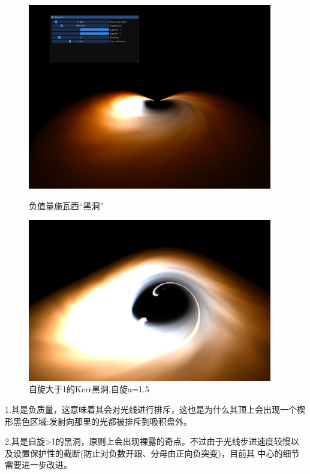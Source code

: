 \documentclass[a4paper, 12pt]{article}
\begin{document}
    \begin{figure}[H]
        \centering
        \begin{minipage}[t]{0.48\textwidth}
            \centering
            \includegraphics[width=0.95\textwidth]{photo/ip0.png}
            \caption{负值量施瓦西“黑洞”}
        \end{minipage}
        \hfill
        \begin{minipage}[t]{0.48\textwidth}
            \centering
            \includegraphics[width=0.95\textwidth]{photo/ip1.png}
            \caption{自旋大于1的Kerr黑洞,自旋a=1.5}
        \end{minipage}
    \end{figure}
    1.其是负质量，这意味着其会对光线进行排斥，这也是为什么其顶上会出现一个楔形黑色区域:发射向那里的光都被排斥到吸积盘外。\par
    2.其是自旋>1的黑洞，原则上会出现裸露的奇点。不过由于光线步进速度较慢以及设置保护性的截断(防止对负数开跟、分母由正向负突变)，目前其
    中心的细节需要进一步改进。
\end{document}
